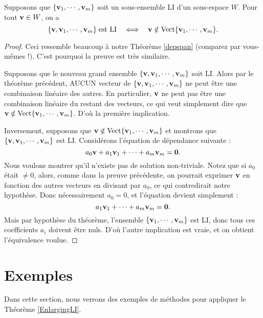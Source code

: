 \begin{theorem}  \label{EnlargingLI}%
Supposons que $\{\mathbf{v}_1, \cdots, \mathbf{v}_m\}$ soit un sous-ensemble LI d'un sous-espace $W$.
Pour tout $\mathbf{v} \in W$, on a
$$
\{\mathbf{v}, \mathbf{v}_1, \cdots, \mathbf{v}_m\} \; \textrm{est LI}\quad \Longleftrightarrow\quad  
\mathbf{v} \notin \textrm{Vect}\{\mathbf{v}_1, \cdots, \mathbf{v}_m\}.
$$
\end{theorem}

\begin{proof}
Ceci ressemble beaucoup à notre Théorème \ref{depspan} (comparez par vous-mêmes !).
C'est pourquoi la preuve est très similaire.

Supposons que le nouveau grand ensemble $\{\mathbf{v}, \mathbf{v}_1, \cdots, \mathbf{v}_m\}$ soit LI.  Alors par le théorème précédent,
AUCUN vecteur de $\{\mathbf{v}, \mathbf{v}_1, \cdots, \mathbf{v}_m\}$ ne peut être une combinaison linéaire des autres.  En particulier, $\mathbf{v}$ ne peut pas être une
combinaison linéaire du restant des vecteurs, ce qui veut simplement dire que
$\mathbf{v} \notin \textrm{Vect}\{\mathbf{v}_1, \cdots, \mathbf{v}_m\}$.  D'où la première implication.

Inversement, supposons que $\mathbf{v} \notin \textrm{Vect}\{\mathbf{v}_1, \cdots, \mathbf{v}_m\}$ et montrons que $\{\mathbf{v}, \mathbf{v}_1, \cdots, \mathbf{v}_m\}$ est LI.
Considérons l'équation de dépendance suivante :
$$
a_0\mathbf{v} + a_1\mathbf{v}_1 + \cdots + a_m\mathbf{v}_m = \mathbf{0}.
$$
Nous voulons montrer qu'il n'existe pas de solution non-triviale.
Notez que si $a_0$ était $\neq 0$, alors, comme dans la preuve précédente, on pourrait exprimer $\mathbf{v}$ en fonction des autres vecteurs en divisant par $a_0$, ce qui contredirait
notre hypothèse. Donc nécessairement $a_0 = 0$, et l'équation devient simplement :
$$
a_1\mathbf{v}_1 + \cdots + a_m\mathbf{v}_m = \mathbf{0}.
$$
Mais par hypothèse du théorème, l'ensemble $\{\mathbf{v}_1, \cdots,\mathbf{v}_m\}$ est LI,  donc tous ces coefficients $a_i$ doivent être nuls. D'où l'autre implication est vraie, et on obtient l'équivalence voulue.
\end{proof}


\section{Exemples} 
Dans cette section, nous verrons des exemples de méthodes pour appliquer le Théorème \ref{EnlargingLI}.

